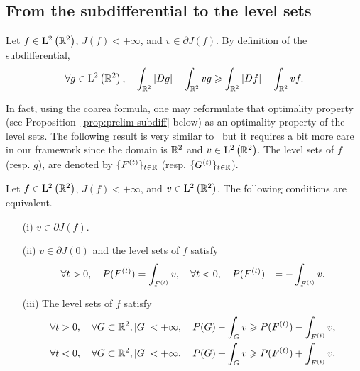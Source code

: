 \subsection{From the subdifferential to the level sets}\label{sec:subdif_to_lev}
Let $f\in\mathrm{L}^2\left(\mathbb{R}^2\right)$, $J(f)<+\infty$, and $v\in \partial J(f)$. By definition of the subdifferential,
\begin{equation}\label{eq:prelim-subdiff}
  \forall g\in \mathrm{L}^2\left(\mathbb{R}^2\right),\quad \int_{\mathbb{R}^2}\left| Dg \right| - \int_{\mathbb{R}^2} vg \geqslant \int_{\mathbb{R}^2}\left| Df \right|-\int_{\mathbb{R}^2} vf.
\end{equation}

In fact, using the coarea formula, one may reformulate that optimality property (see Proposition~\ref{prop:prelim-subdiff} below) as an optimality property of the level sets. The following result is very similar to~\cite[Corollary~2.4]{kindermann2006denoising} but it requires a bit more care in our framework since the domain is $\mathbb{R}^2$ and $v\in \mathrm{L}^2\left(\mathbb{R}^2\right)$.
The level sets of $f$ (resp. $g$), are denoted by $\{F^{(t)}\}_{t\in \mathbb{R}}$ (resp. $\{G^{(t)}\}_{t\in \mathbb{R}}$).

\begin{prop}\label{prop:prelim-subdiff}
  Let $f\in \mathrm{L}^2\left(\mathbb{R}^2\right)$, $J(f)<+\infty$, and $v\in \mathrm{L}^2\left(\mathbb{R}^2\right)$. The following conditions are equivalent.
\begin{itemize}
  \item[(i)] $v\in \partial J(f)$.
  \item[(ii)]  $v\in \partial J(0)$ and the level sets of $f$ satisfy
    \begin{align}\label{eq:prelim-setgeomcalib}
      \forall t>0,\quad P(F^{(t)})&=\int_{F^{(t)}} v, \quad \forall t<0,\quad P(F^{(t)})&=-\int_{F^{(t)}} v.
    \end{align}

  \item[(iii)] The level sets of $f$ satisfy
    \begin{align}
      \label{eq:setgeompbplus}\forall t>0,\quad \forall G\subset \mathbb{R}^2, \left| G \right|<+\infty,\quad P(G) - \int_{G} v &\geqslant P(F^{(t)})-\int_{F^{(t)}} v, \\
      \label{eq:setgeompbminus}\forall t<0,\quad \forall G\subset \mathbb{R}^2, \left| G \right|<+\infty,\quad P(G) + \int_{G} v &\geqslant P(F^{(t)})+\int_{F^{(t)}} v. 
    \end{align}
  \end{itemize}
   \end{prop}

